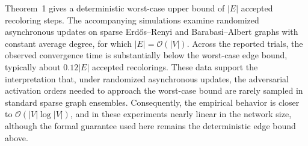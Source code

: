 \begin{remark}
Theorem~1 gives a deterministic worst-case upper bound of $|E|$ accepted
recoloring steps. The accompanying simulations examine randomized asynchronous
updates on sparse Erd\H{o}s--Renyi and Barabasi--Albert graphs with constant
average degree, for which $|E|=\mathcal{O}(|V|)$. Across the reported trials,
the observed convergence time is substantially below the worst-case edge
bound, typically about $0.12|E|$ accepted recolorings. These data support the
interpretation that, under randomized asynchronous updates, the adversarial
activation orders needed to approach the worst-case bound are rarely sampled in
standard sparse graph ensembles. Consequently, the empirical behavior is closer
to $\mathcal{O}(|V|\log |V|)$, and in these experiments nearly linear in the
network size, although the formal guarantee used here remains the deterministic
edge bound above.
\end{remark}
